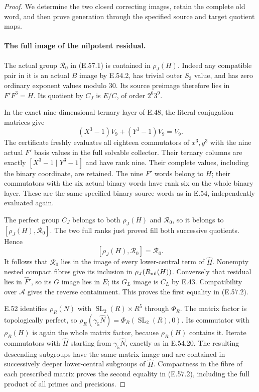 \begin{proof}
We determine the two closed correcting images, retain
the complete old word, and then prove generation through
the specified source and target quotient maps.

\paragraph{The full image of the nilpotent residual.}
The actual group $\mathcal R_0$ in \textup{(E.57.1)}
is contained in $\rho_J(H)$.  Indeed any compatible
pair in it is an actual $B$ image by E.54.2, has trivial
outer $S_3$ value, and has zero ordinary exponent values
modulo $30$.  Its source preimage therefore lies in
$F'F^3=H$.
Its quotient by $C_J$ is $E/C$, of order $2^6 3^9$.

In the exact nine-dimensional ternary layer of E.48,
the literal conjugation matrices give
\[
       (X^3-1)V_9+(Y^3-1)V_9=V_9.
 \tag{E.57.11}
\]
The certificate freshly evaluates all eighteen
commutators of $x^3,y^3$ with the nine actual $F'$
basis values in the full solvable collector.  Their
ternary columns are exactly $[X^3-1\mid Y^3-1]$ and
have rank nine.  Their complete values, including
the binary coordinate, are retained.  The nine
$F'$ words belong to $H$; their commutators with
the six actual binary words have rank six on the
whole binary layer.  These are the same specified
binary source words as in E.54, independently
evaluated again.

The perfect group $C_J$ belongs to both
$\rho_J(H)$ and $\mathcal R_0$, so it belongs to
$[\rho_J(H),\mathcal R_0]$.  The two full ranks
just proved fill both successive quotients.  Hence
\[
                    [\rho_J(H),\mathcal R_0]=\mathcal R_0.
 \tag{E.57.12}
\]
It follows that $\mathcal R_0$ lies in the image of
every lower-central term of $\widehat H$.
Nonempty nested compact fibres give its inclusion
in $\rho_J(R_{\rm nil}(H))$.
Conversely that residual lies in $\widehat F'$,
so its $G$ image lies in $E$; its $G_L$ image is
$C_L$ by E.43.  Compatibility over $\mathcal A$
gives the reverse containment.  This proves the
first equality in \textup{(E.57.2)}.

E.52 identifies $\rho_R(N)$ with
$\operatorname{SL}_2(R)\times R^5$ through $\Phi_R$.
The matrix factor is topologically perfect, so
$\rho_R(\gamma_5\widehat N)=\Phi_R(\operatorname{SL}_2(R),0)$.
Its commutator with $\rho_R(H)$ is again the whole
matrix factor, because $\rho_R(H)$ contains it.
Iterate commutators with $\widehat H$ starting
from $\gamma_5\widehat N$, exactly as in E.54.20.
The resulting descending subgroups have the same
matrix image and are contained in successively
deeper lower-central subgroups of $\widehat H$.
Compactness in the fibre of each prescribed
matrix proves the second equality in
\textup{(E.57.2)}, including the full product of
all primes and precisions.


\end{proof}
